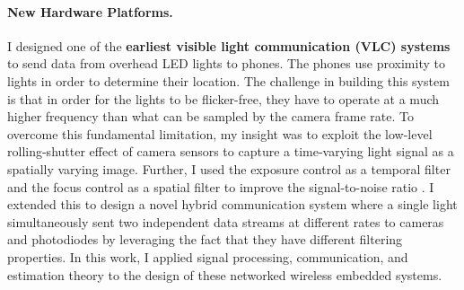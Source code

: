 \documentclass[10pt]{article}
\begin{document}

\paragraph{New Hardware Platforms. }

I designed one of the \textbf{earliest visible light communication (VLC) systems} to send data from overhead LED lights to phones. The phones use proximity to lights in order to determine their location.  The challenge in building this system is that in order for the lights to be flicker-free, they have to operate at a much higher frequency than what can be sampled by the camera frame rate. 
To overcome this fundamental limitation, my insight was to exploit the low-level rolling-shutter effect of camera sensors to capture a time-varying light signal as a spatially varying image. Further, I used the exposure control as a temporal filter and the focus control as a spatial filter to improve the signal-to-noise ratio \cite{rajagopal2014visual, rajagopal2014demonstration}. %
I extended this to design a novel hybrid communication system where a single light simultaneously sent two independent data streams at different rates to cameras and photodiodes \cite{rajagopal2014hybrid} by leveraging the fact that they have different filtering  properties. %
In this work, I applied signal processing, communication, and estimation theory to the design of these networked wireless embedded systems.
\end{document}
